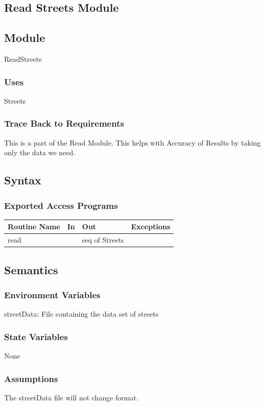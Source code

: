 \documentclass[12pt]{article}
\begin{document}
\newpage
\subsection{Read Streets Module}
\subsection*{Module}
ReadStreets

\subsubsection*{Uses}
Streets

\subsubsection*{Trace Back to Requirements}
This is a part of the Read Module. This helps with Accuracy of Results by taking only the data we need.

\subsection*{Syntax}
\subsubsection*{Exported Access Programs}
    \begin{tabular}{|l|l|l|l|}
    \hline
    \textbf{Routine Name} & \textbf{In} & \textbf{Out} & \textbf{Exceptions}\\
    \hline
    read & ~ & seq of Streets & ~\\
    \hline
    \end{tabular}
    
\subsection*{Semantics}
\subsubsection*{Environment Variables}
streetData: File containing the data set of streets

\subsubsection*{State Variables}
None

\subsubsection*{Assumptions}
The streetData file will not change format.
\end{document}

